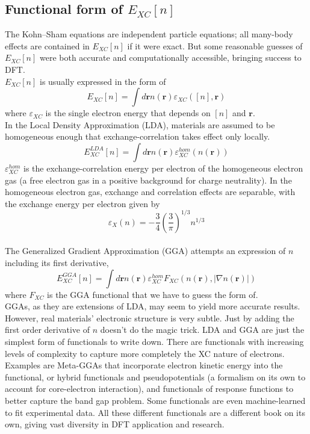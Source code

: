 \documentclass{article}
\begin{document}
\subsection*{Functional form of $E_{XC}[n]$}
The Kohn--Sham equations are independent particle equations; all many-body effects are contained in $E_{XC}[n]$ if it were exact. But some reasonable guesses of $E_{XC}[n]$ were both accurate and computationally accessible, bringing success to DFT.\\
$E_{XC}[n]$ is usually expressed in the form of
$$E_{XC}[n]=\int d\mathbf{r}n(\mathbf{r})\varepsilon_{XC}([n],\mathbf{r})$$
where $\varepsilon_{XC}$ is the single electron energy that depends on $[n]$ and $\mathbf{r}$.\\
In the Local Density Approximation (LDA), materials are assumed to be homogeneous enough that exchange-correlation takes effect only locally.
$$E^{LDA}_{XC}[n]=\int d\mathbf{r} n(\mathbf{r})\varepsilon_{XC}^{hom}(n(\mathbf{r}))$$
$\varepsilon_{XC}^{hom}$ is the exchange-correlation energy per electron of the homogeneous electron gas (a free electron gas in a positive background for charge neutrality). In the homogeneous electron gas, exchange and correlation effects are separable, with the exchange energy per electron given by
$$\varepsilon_X(n)=-\frac{3}{4}\left(\frac{3}{\pi}\right)^{1/3}n^{1/3}$$\\
The Generalized Gradient Approximation (GGA) attempts an expression of $n$ including its first derivative,
$$E^{GGA}_{XC}[n]=\int d\mathbf{r} n(\mathbf{r})\varepsilon_{XC}^{hom}F_{XC}(n(\mathbf{r}),|\nabla n(\mathbf{r})|)$$
where $F_{XC}$ is the GGA functional that we have to guess the form of. \\
GGAs, as they are extensions of LDA, may seem to yield more accurate results. However, real materials' electronic structure is very subtle. Just by adding the first order derivative of $n$ doesn't do the magic trick. LDA and GGA are just the simplest form of functionals to write down. There are functionals with increasing levels of complexity to capture more completely the XC nature of electrons. Examples are Meta-GGAs that incorporate electron kinetic energy into the functional, or hybrid functionals and pseudopotentials (a formalism on its own to account for core-electron interaction), and functionals of response functions to better capture the band gap problem. Some functionals are even machine-learned to fit experimental data. All these different functionals are a different book on its own, giving vast diversity in DFT application and research.\\
\end{document}
